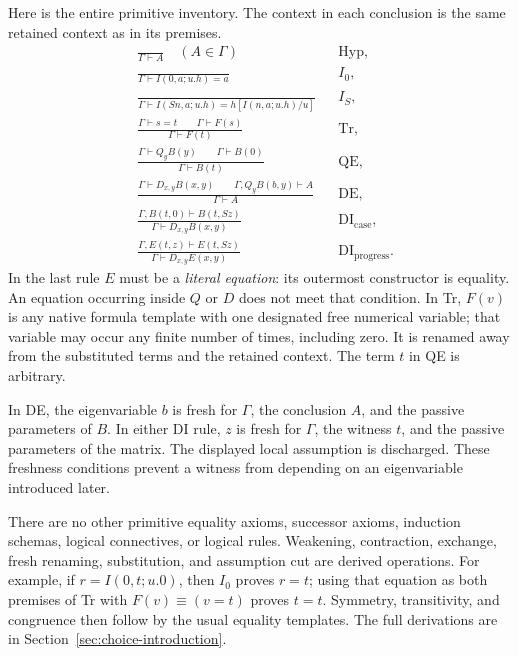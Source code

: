 \documentclass[11pt,letterpaper]{article}
\theoremstyle{definition}
\theoremstyle{remark}
\begin{document}
Here is the entire primitive inventory. The context in each conclusion is
the same retained context as in its premises.
\begin{align*}
 &\frac{}{\Gamma\vdash A}\quad(A\in\Gamma)
 &&\mathrm{Hyp},\\[4pt]
 &\frac{}{\Gamma\vdash I(0,a;u.h)=a}
 &&I_0,\\[4pt]
 &\frac{}{\Gamma\vdash I(Sn,a;u.h)=h[I(n,a;u.h)/u]}
 &&I_S,\\[4pt]
 &\frac{\Gamma\vdash s=t\qquad\Gamma\vdash F(s)}
        {\Gamma\vdash F(t)}
 &&\mathrm{Tr},\\[4pt]
 &\frac{\Gamma\vdash Q_yB(y)\qquad\Gamma\vdash B(0)}
        {\Gamma\vdash B(t)}
 &&\mathrm{QE},\\[4pt]
 &\frac{\Gamma\vdash D_{x,y}B(x,y)\qquad
         \Gamma,Q_yB(b,y)\vdash A}
        {\Gamma\vdash A}
 &&\mathrm{DE},\\[4pt]
 &\frac{\Gamma,B(t,0)\vdash B(t,Sz)}
        {\Gamma\vdash D_{x,y}B(x,y)}
 &&\mathrm{DI}_{\mathrm{case}},\\[4pt]
 &\frac{\Gamma,E(t,z)\vdash E(t,Sz)}
        {\Gamma\vdash D_{x,y}E(x,y)}
 &&\mathrm{DI}_{\mathrm{progress}}.
\end{align*}
In the last rule $E$ must be a \emph{literal equation}: its outermost
constructor is equality. An equation occurring inside $Q$ or $D$ does not
meet that condition. In Tr, $F(v)$ is any native formula template with one
designated free numerical variable; that variable may occur any finite number
of times, including zero. It is renamed away from the substituted terms and
the retained context. The term $t$ in QE is arbitrary.

In DE, the eigenvariable $b$ is fresh for $\Gamma$, the conclusion $A$,
and the passive parameters of $B$. In either DI rule, $z$ is fresh for
$\Gamma$, the witness $t$, and the passive parameters of the matrix.
The displayed local assumption is discharged. These freshness conditions
prevent a witness from depending on an eigenvariable introduced later.

There are no other primitive equality axioms, successor axioms, induction
schemas, logical connectives, or logical rules. Weakening, contraction,
exchange, fresh renaming, substitution, and assumption cut are derived
operations. For example, if $r=I(0,t;u.0)$, then $I_0$ proves $r=t$;
using that equation as both premises of Tr with $F(v)\equiv(v=t)$ proves
$t=t$. Symmetry, transitivity, and congruence then follow by the usual
equality templates. The full derivations are in
Section~\ref{sec:choice-introduction}.
\end{document}
